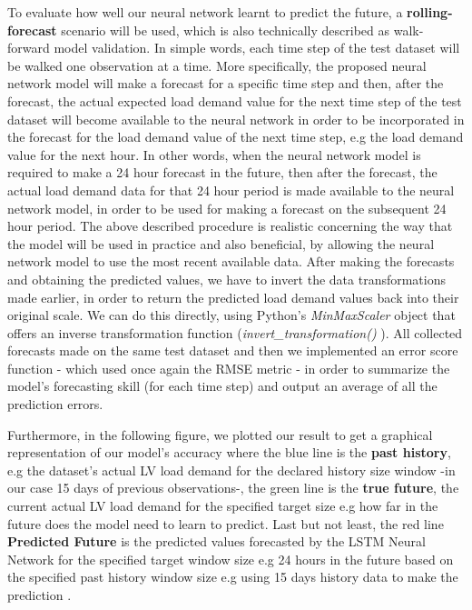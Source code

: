 \par To evaluate how well our neural network learnt to predict the future, a \textbf{rolling-forecast} scenario will be used, which is also technically described as walk-forward model validation. In simple words, each time step of the test dataset will be walked one observation at a time. More specifically, the proposed neural network model will make a forecast for a specific time step and then, after the forecast, the actual expected load demand value for the next time step of the test dataset will become available to the neural network in order to be incorporated in the forecast for the load demand value of the next time step, e.g the load demand value for the next hour. In other words, when the neural network model is required to make a 24 hour forecast in the future, then after the forecast, the actual load demand data for that 24 hour period is made available to the neural network model, in order to be used for making a forecast on the subsequent 24 hour period. The above described procedure is realistic concerning the way that the model will be used in practice and also beneficial, by allowing the neural network model to use the most recent available data. After making the forecasts and obtaining the predicted values, we have to invert the data transformations made earlier, in order to return the predicted load demand values back into their original scale. We can do this directly, using Python's \textit{MinMaxScaler} object that offers an inverse transformation function (\textit{invert\_transformation()} ). All collected forecasts made on the same test dataset and then we implemented an error score function - which used once again the RMSE metric - in order to summarize the model's forecasting skill (for each time step) and output an average of all the prediction errors. 
\par Furthermore, in the following figure, we plotted our result to get a graphical representation of our model's accuracy where the blue line is the \textbf{past history}, e.g the dataset's actual LV load demand for the declared history size window -in our case 15 days of previous observations-, the green line is the \textbf{true future}, the current actual LV load demand for the specified target size e.g how far in the future does the model need to learn to predict. Last but not least, the red line \textbf{Predicted Future} is the predicted values forecasted by the LSTM Neural Network for the specified target window size e.g 24 hours in the future based on the specified past history window size e.g using 15 days history data to make the prediction \cite{tensor}. 
